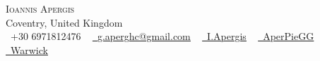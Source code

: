 \documentclass[10pt]{article}
\newcommand{\xfilll}[2][1ex]{
\dimen0=#2\advance\dimen0 by #1
\leaders\hrule height \dimen0 depth -#1\hfill}
\begin{document}
\begin{table}
    \begin{center}
    {\Huge \scshape Ioannis Apergis} \\ \vspace{1pt}
    Coventry, United Kingdom\\ \vspace{3pt}
    \small \raisebox{-0.1\height}\faPhone\ +30 6971812476 ~ \href{mailto:yourmail@gmail.com}{\raisebox{-0.2\height}\faEnvelope\  \underline{g.aperghc@gmail.com}} ~ 
    \href{https://www.linkedin.com/in/iapergis2401/}{\raisebox{-0.2\height}\faLinkedin\ \underline{I.Apergis}}  ~
    \href{https://github.com/AperpieGG}{\raisebox{-0.2\height}\faGithub\ \underline{AperPieGG}} ~   \href{https://warwick.ac.uk/fac/sci/physics/research/astro/people/ioannisapergis/}{\raisebox{-0.2\height}\faGlobe\ \underline{Warwick}}       
    \vspace{-8pt}
\end{center}
\end{table}    

\setlength{\tabcolsep}{15pt} %



\end{document}
